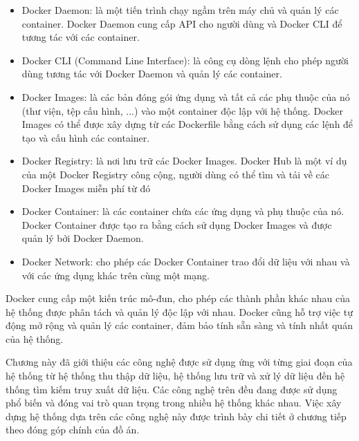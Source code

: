 \documentclass[../DoAn.tex]{subfiles}
\begin{document}
\begin{itemize}
    \item Docker Daemon: là một tiến trình chạy ngầm trên máy chủ và quản lý các container. Docker Daemon cung cấp API cho người dùng và Docker CLI để tương tác với các container.
    \item Docker CLI (Command Line Interface): là công cụ dòng lệnh cho phép người dùng tương tác với Docker Daemon và quản lý các container.
    \item Docker Images: là các bản đóng gói ứng dụng và tất cả các phụ thuộc của nó (thư viện, tệp cấu hình, ...) vào một container độc lập với hệ thống. Docker Images có thể được xây dựng từ các Dockerfile bằng cách sử dụng các lệnh để tạo và cấu hình các container.
    \item Docker Registry: là nơi lưu trữ các Docker Images. Docker Hub là một ví dụ của một Docker Registry công cộng, người dùng có thể tìm và tải về các Docker Images miễn phí từ đó
    \item Docker Container: là các container chứa các ứng dụng và phụ thuộc của nó. Docker Container được tạo ra bằng cách sử dụng Docker Images và được quản lý bởi Docker Daemon.
    \item Docker Network: cho phép các Docker Container trao đổi dữ liệu với nhau và với các ứng dụng khác trên cùng một mạng.
\end{itemize}

Docker cung cấp một kiến trúc mô-đun, cho phép các thành phần khác nhau của hệ thống được phân tách và quản lý độc lập với nhau. Docker cũng hỗ trợ việc tự động mở rộng và quản lý các container, đảm bảo tính sẵn sàng và tính nhất quán của hệ thống.

Chương này đã giới thiệu các công nghệ được sử dụng ứng với từng giai đoạn của hệ thống từ hệ thống thu thập dữ liệu, hệ thống lưu trữ và xử lý dữ liệu đến hệ thống tìm kiếm truy xuất dữ liệu. Các công nghệ trên đều đang được sử dụng phổ biến và đóng vai trò quan trọng trong nhiều hệ thống khác nhau. Việc xây dựng hệ thống dựa trên các công nghệ này được trình bày chi tiết ở chương tiếp theo đóng góp chính của đồ án.
\end{document}
